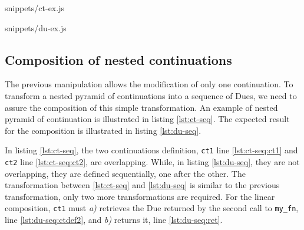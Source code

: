              {snippets/ct-ex.js}

             {snippets/du-ex.js}

\subsection{Composition of nested continuations} \label{section:overlapping-continuations}

The previous manipulation allows the modification of only one continuation.
To transform a nested pyramid of continuations into a sequence of Dues, we need to assure the composition of this simple transformation.
An example of nested pyramid of continuation is illustrated in listing \ref{lst:ct-seq}.
The expected result for the composition is illustrated in listing \ref{lst:du-seq}.

In listing \ref{lst:ct-seq}, the two continuations definition, \texttt{ct1} line \ref{lst:ct-seq:ct1} and \texttt{ct2} line \ref{lst:ct-seq:ct2}, are overlapping.
While, in listing \ref{lst:du-seq}, they are not overlapping, they are defined sequentially, one after the other.
The transformation between \ref{lst:ct-seq} and \ref{lst:du-seq} is similar to the previous transformation, only two more transformations are required.
For the linear composition, \texttt{ct1} must \textit{a)} retrieves the Due returned by the second call to \texttt{my_fn}, line \ref{lst:du-seq:ctdef2}, and \textit{b)} returns it, line \ref{lst:du-seq:ret}.

